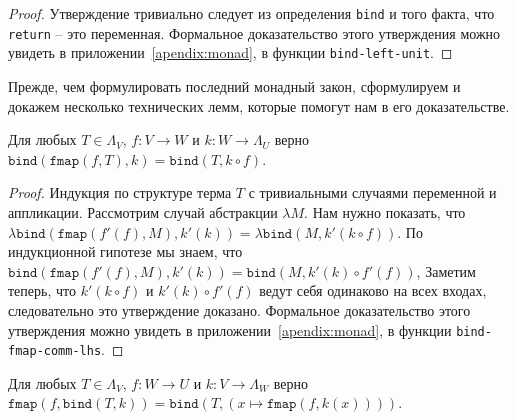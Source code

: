 \begin{proof}
  Утверждение тривиально следует из определения \texttt{bind} и того факта, что \texttt{return} -- это переменная. Формальное доказательство этого утверждения можно увидеть в приложении~\ref{apendix:monad}, в функции \texttt{bind-left-unit}.
\end{proof}

Прежде, чем формулировать последний монадный закон, сформулируем и докажем несколько технических лемм, которые помогут нам в его доказательстве.

\begin{lemma}
  \label{monad:bind-fmap-comm-lhs}
  Для любых $T \in \Lambda_{V}$, $f : V \to W$ и $k : W \to \Lambda_{U}$ верно $\texttt{bind}(\texttt{fmap}(f, T), k) = \texttt{bind}(T, k \circ f)$.
\end{lemma}

\begin{proof}
  Индукция по структуре терма $T$ с тривиальными случаями переменной и аппликации. Рассмотрим случай абстракции $\lambda M$. Нам нужно показать, что $\lambda \texttt{bind}(\texttt{fmap}(f'(f), M), k'(k)) = \lambda \texttt{bind}(M, k'(k \circ f))$. По индукционной гипотезе мы знаем, что $\texttt{bind}(\texttt{fmap}(f'(f), M), k'(k)) = \texttt{bind}(M, k'(k) \circ f'(f))$, Заметим теперь, что $k'(k \circ f)$ и $k'(k) \circ f'(f)$ ведут себя одинаково на всех входах, следовательно это утверждение доказано. Формальное доказательство этого утверждения можно увидеть в приложении~\ref{apendix:monad}, в функции \texttt{bind-fmap-comm-lhs}.
\end{proof}

\begin{lemma}
  \label{monad:bind-fmap-comm-rhs}
  Для любых $T \in \Lambda_{V}$, $f : W \to U$ и $k : V \to \Lambda_{W}$ верно $ \texttt{fmap}(f, \texttt{bind}(T, k)) = \texttt{bind}(T, (x \mapsto \texttt{fmap}(f, k(x))))$.
\end{lemma}

